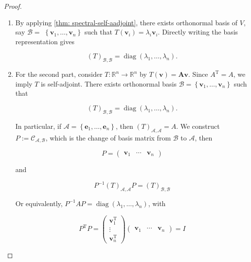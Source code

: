 \begin{proof}
\begin{enumerate}
    \item By applying \autoref{thm: spectral-self-aadjoint}, there exists orthonormal basis of \(V\), say \(\mathcal{B} =\)  \(\left\{  {{\mathbf{v}}_{1},\ldots ,{\mathbf{v}}_{n}}\right\}\) such that \(T\left( {\mathbf{v}}_{i}\right)  = {\lambda }_{i}{\mathbf{v}}_{i}\). Directly writing the basis representation gives

    \[
    {\left( T\right) }_{\mathcal{B},\mathcal{B}} = \operatorname{diag}\left( {{\lambda }_{1},\ldots ,{\lambda }_{n}}\right) .
    \]
    
    \item For the second part, consider \(T : {\mathbb{R}}^{n} \rightarrow  {\mathbb{R}}^{n}\) by \(T\left( \mathbf{v}\right)  = \mathbf{{Av}}\). Since \({A}^{\mathrm{T}} = A\), we imply \(T\) is self-adjoint. There exists orthonormal basis \(\mathcal{B} = \left\{  {{\mathbf{v}}_{1},\ldots ,{\mathbf{v}}_{n}}\right\}\) such that

    \[
    {\left( T\right) }_{\mathcal{B},\mathcal{B}} = \operatorname{diag}\left( {{\lambda }_{1},\ldots ,{\lambda }_{n}}\right) .
    \]
    
    In particular, if \(\mathcal{A} = \left\{  {{\mathbf{e}}_{1},\ldots ,{\mathbf{e}}_{n}}\right\}\), then \({\left( T\right) }_{\mathcal{A},\mathcal{A}} = A\). We construct \(P \mathrel{\text{ := }} {\mathcal{C}}_{\mathcal{A},\mathcal{B}}\), which is the change of basis matrix from \(\mathcal{B}\) to \(\mathcal{A}\), then
    
    \[
    P = \left( \begin{array}{lll} {\mathbf{v}}_{1} & \cdots & {\mathbf{v}}_{n} \end{array}\right)
    \]
    
    and
    
    \[
    {P}^{-1}{\left( T\right) }_{\mathcal{A},\mathcal{A}}P = {\left( T\right) }_{\mathcal{B},\mathcal{B}}
    \]
    
    Or equivalently, \({P}^{-1}{AP} = \operatorname{diag}\left( {{\lambda }_{1},\ldots ,{\lambda }_{n}}\right)\), with
    
    \[
    {P}^{\mathrm{T}}P = \left( \begin{matrix} {\mathbf{v}}_{1}^{\mathrm{T}} \\  \vdots \\  {\mathbf{v}}_{n}^{\mathrm{T}} \end{matrix}\right) \left( \begin{array}{lll} {\mathbf{v}}_{1} & \cdots & {\mathbf{v}}_{n} \end{array}\right)  = I
    \]
\end{enumerate}
\end{proof}

